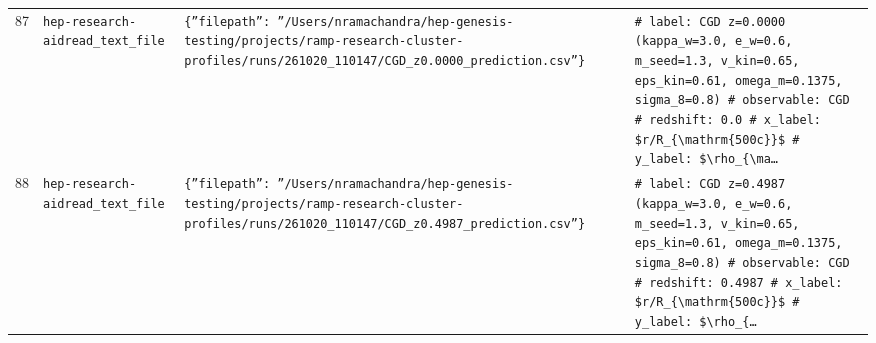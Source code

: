 \documentclass[11pt,a4paper]{article}
\begin{document}
\begin{longtable}{@{}p{}p{}p{}p{}@{}}
87 & \texttt{hep-research-aid}\newline\texttt{read\_\allowbreak{}text\_\allowbreak{}file} & \texttt{\{''filepath'':\allowbreak{} ''/\allowbreak{}Users/\allowbreak{}nramachandra/\allowbreak{}hep-genesis-testing/\allowbreak{}projects/\allowbreak{}ramp-research-cluster-profiles/\allowbreak{}runs/\allowbreak{}261020\_\allowbreak{}110147/\allowbreak{}CGD\_\allowbreak{}z0.0000\_\allowbreak{}prediction.csv''\}\allowbreak{}} & \texttt{\# label:\allowbreak{} CGD z=\allowbreak{}0.0000 (kappa\_\allowbreak{}w=\allowbreak{}3.0,\allowbreak{} e\_\allowbreak{}w=\allowbreak{}0.6,\allowbreak{} m\_\allowbreak{}seed=\allowbreak{}1.3,\allowbreak{} v\_\allowbreak{}kin=\allowbreak{}0.65,\allowbreak{} eps\_\allowbreak{}kin=\allowbreak{}0.61,\allowbreak{} omega\_\allowbreak{}m=\allowbreak{}0.1375,\allowbreak{} sigma\_\allowbreak{}8=\allowbreak{}0.8)\allowbreak{} \# observable:\allowbreak{} CGD \# redshift:\allowbreak{} 0.0 \# x\_\allowbreak{}label:\allowbreak{} \$r/\allowbreak{}R\_\allowbreak{}\{\textbackslash{}\allowbreak{}mathrm\{500c\}\allowbreak{}\}\allowbreak{}\$ \# y\_\allowbreak{}label:\allowbreak{} \$\textbackslash{}\allowbreak{}rho\_\allowbreak{}\{\textbackslash{}\allowbreak{}ma\ldots{}\allowbreak{}} \\
88 & \texttt{hep-research-aid}\newline\texttt{read\_\allowbreak{}text\_\allowbreak{}file} & \texttt{\{''filepath'':\allowbreak{} ''/\allowbreak{}Users/\allowbreak{}nramachandra/\allowbreak{}hep-genesis-testing/\allowbreak{}projects/\allowbreak{}ramp-research-cluster-profiles/\allowbreak{}runs/\allowbreak{}261020\_\allowbreak{}110147/\allowbreak{}CGD\_\allowbreak{}z0.4987\_\allowbreak{}prediction.csv''\}\allowbreak{}} & \texttt{\# label:\allowbreak{} CGD z=\allowbreak{}0.4987 (kappa\_\allowbreak{}w=\allowbreak{}3.0,\allowbreak{} e\_\allowbreak{}w=\allowbreak{}0.6,\allowbreak{} m\_\allowbreak{}seed=\allowbreak{}1.3,\allowbreak{} v\_\allowbreak{}kin=\allowbreak{}0.65,\allowbreak{} eps\_\allowbreak{}kin=\allowbreak{}0.61,\allowbreak{} omega\_\allowbreak{}m=\allowbreak{}0.1375,\allowbreak{} sigma\_\allowbreak{}8=\allowbreak{}0.8)\allowbreak{} \# observable:\allowbreak{} CGD \# redshift:\allowbreak{} 0.4987 \# x\_\allowbreak{}label:\allowbreak{} \$r/\allowbreak{}R\_\allowbreak{}\{\textbackslash{}\allowbreak{}mathrm\{500c\}\allowbreak{}\}\allowbreak{}\$ \# y\_\allowbreak{}label:\allowbreak{} \$\textbackslash{}\allowbreak{}rho\_\allowbreak{}\{\ldots{}\allowbreak{}} \\

\end{longtable}
\end{document}
